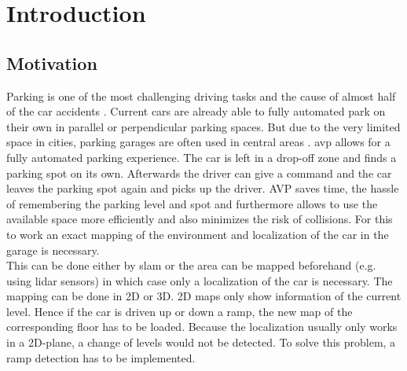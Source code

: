 \chapter{Introduction}
\label{ch:Introduction}

\section{Motivation}
Parking is one of the most challenging driving tasks and the cause of almost half of the car accidents \cite{accident}.
Current cars are already able to fully automated park on their own in parallel or perpendicular parking spaces.
But due to the very limited space in cities, parking garages are often used in central areas \cite{Banzhaf2017}.
\gls{avp} allows for a fully automated parking experience.
The car is left in a drop-off zone and finds a parking spot on its own.
Afterwards the driver can give a command and the car leaves the parking spot again and picks up the driver.
AVP saves time, the hassle of remembering the parking level and spot and furthermore allows to use the available space more efficiently and also minimizes the risk of collisions.
For this to work an exact mapping of the environment and localization of the car in the garage is necessary.\\
This can be done either by \gls{slam} or the area can be mapped beforehand (e.g. using \gls{lidar} sensors) in which case only a localization of the car is necessary.
The mapping can be done in 2D or 3D. 2D maps only show information of the current level. Hence if the car is driven up or down a ramp, the new map of the corresponding floor has to be loaded.
Because the localization usually only works in a 2D-plane, a change of levels would not be detected.
To solve this problem, a ramp detection has to be implemented.



